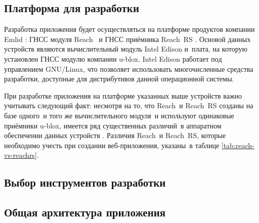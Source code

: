 
\subsection{Платформа для разработки}

Разработка приложения будет осуществляться на платформе продуктов компании Emlid \cite{Emlid}: ГНСС модуля Reach \cite{Reach}~и ГНСС приёмника Reach~RS \cite{ReachRS}. Основой данных устройств являются вычислительный модуль Intel Edison и~плата, на которую установлен ГНСС модулю компании u-blox. Intel Edison работает под управлением GNU/Linux, что позволяет использовать многочисленные средства разработки, доступные для дистрибутивов данной операционной системы. \par

При разработке приложения на платформе указанных выше устройств важно учитывать следующий факт: несмотря на то, что Reach~и Reach~RS созданы на базе одного~и того же вычислительного модуля~и используют одинаковые приёмники u-blox, имеется ряд существенных различий~в аппаратном обеспечении данных устройств \cite{Reach, ReachRS}. Различия Reach~и Reach~RS, которые необходимо учесть при создании веб-приложения, указаны~в таблице \ref{tab:reach-vs-reachrs}.


\subsection{Выбор инструментов разработки}

\subsection{Общая архитектура приложения}

\newpage